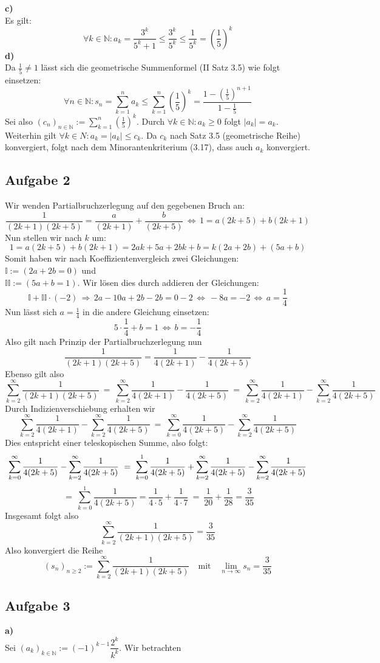 \documentclass[a4paper,graphics,11pt]{article}
\newcommand{\aufgabe}[1]{\subsection*{Aufgabe #1}}
\begin{document}
\textbf{c)}\\[5pt]
Es gilt:
$$
    \forall k \in \mathbb{N} \colon a_k = \frac{3^k}{5^k+1} \leq \frac{3^k}{5^k} \leq \frac{1}{5^k}
    = \left(\frac{1}{5}\right)^k
$$
\textbf{d)}\\[5pt]
Da $\frac{1}{5}\neq1$ lässt sich die geometrische Summenformel (II Satz 3.5)
wie folgt einsetzen:
$$
    \forall n \in \mathbb{N} \colon s_n = \sum_{k=1}^{n} a_k
    \leq \sum_{k=1}^{n} \left(\frac{1}{5}\right)^k
    = \frac{1-\left(\frac{1}{5}\right)^{n+1}}{1-\frac{1}{5}}
$$
Sei also $(c_n)_{n \in \mathbb{N}} := \sum_{k=1}^{n} \left(\frac{1}{5}\right)^k$.
Durch $\forall k \in \mathbb{N} \colon a_k \geq 0$ folgt $|a_k| = a_k$.\\
Weiterhin gilt $\forall k \in N\colon a_k = |a_k| \leq c_k$. Da $c_k$ nach
Satz 3.5 (geometrische Reihe) konvergiert, folgt nach dem Minorantenkriterium (3.17), dass
auch $a_k$ konvergiert.
\aufgabe{2}
Wir wenden Partialbruchzerlegung auf den gegebenen Bruch an:
$$
    \frac{1}{(2k+1)(2k+5)} = \frac{a}{(2k+1)} + \frac{b}{(2k+5)} \,\Longleftrightarrow\,
    1 = a(2k+5) + b(2k+1)
$$
Nun stellen wir nach $k$ um:
$$
    1 = a(2k+5) + b(2k+1) = 2ak+5a+2bk+b = k(2a+2b) + (5a+b)
$$
Somit haben wir nach Koeffizientenvergleich zwei Gleichungen: $ \mathbb{I}:=(2a+2b = 0)$
und \\$\mathbb{II}:=(5a+b = 1)$. Wir lösen dies durch addieren der Gleichungen:
$$
    \mathbb{I} + \mathbb{II}\cdot(-2) \,\Longrightarrow\, 2a-10a+2b-2b=0-2
    \,\Longleftrightarrow\, -8a = -2
    \,\Longleftrightarrow\, a = \frac{1}{4}
$$
Nun lässt sich $a = \frac{1}{4}$ in die andere Gleichung einsetzen:
$$
    5\cdot \frac{1}{4}+b = 1 \,\Longleftrightarrow\, b = -\frac{1}{4}
$$
Also gilt nach Prinzip der Partialbruchzerlegung nun
$$
    \frac{1}{(2k+1)(2k+5)} = \frac{1}{4(2k+1)} - \frac{1}{4(2k+5)}
$$
Ebenso gilt also
$$
    \sum_{k=2}^{\infty} \frac{1}{(2k+1)(2k+5)}
    \ =\ \sum_{k=2}^{\infty} \frac{1}{4(2k+1)} - \frac{1}{4(2k+5)}
    \ =\ \sum_{k=2}^{\infty} \frac{1}{4(2k+1)} - \sum_{k=2}^{\infty} \frac{1}{4(2k+5)}
$$
Durch Indizienverschiebung erhalten wir
$$
    \sum_{k=2}^{\infty} \frac{1}{4(2k+1)} - \sum_{k=2}^{\infty} \frac{1}{4(2k+5)}
    \ =\ \sum_{k=0}^{\infty} \frac{1}{4(2k+5)} - \sum_{k=2}^{\infty} \frac{1}{4(2k+5)}
$$
Dies entspricht einer teleskopischen Summe, also folgt:
$$
    \sum_{k=0}^{\infty} \frac{1}{4(2k+5)} - \sum_{k=2}^{\infty} \frac{1}{4(2k+5)}
    \ =\ \sum_{k=0}^{1} \frac{1}{4(2k+5)} +
    \sum_{k=2}^{\infty} \frac{1}{4(2k+5)} - \sum_{k=2}^{\infty} \frac{1}{4(2k+5)}\\
$$$$
    \ =\ \sum_{k=0}^{1} \frac{1}{4(2k+5)} = \frac{1}{4\cdot 5} + \frac{1}{4\cdot 7} 
    \ =\ \frac{1}{20} + \frac{1}{28} = \frac{3}{35}
$$
Insgesamt folgt also
$$
    \sum_{k=2}^{\infty} \frac{1}{(2k+1)(2k+5)} = \frac{3}{35}
$$
Also konvergiert die Reihe
$$
    (s_n)_{n\geq 2} := \sum_{k=2}^{\infty} \frac{1}{(2k+1)(2k+5)}\quad\text{mit}\quad
    \lim_{n \to \infty} s_n = \frac{3}{35}
$$
\aufgabe{3}
\textbf{a)}\\[5pt]
Sei $(a_k)_{k \in \mathbb{N}} := (-1)^{k-1}\dfrac{2^k}{k^k}$. Wir betrachten
\end{document}
